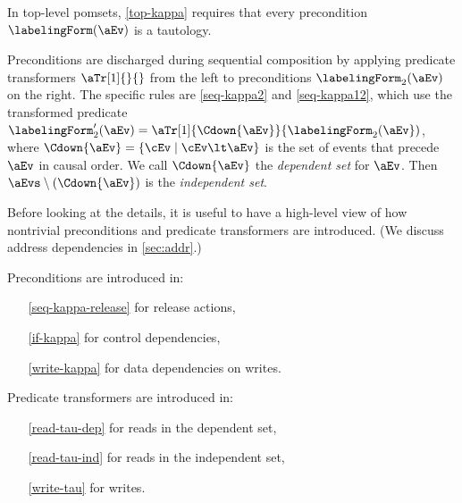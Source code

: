 In top-level pomsets, \ref{top-kappa} requires that every precondition
$\labelingForm(\aEv)$ is a tautology.

Preconditions are discharged during sequential composition by applying
predicate transformers $\aTr[1]{}{}$ from the left to preconditions
$\labelingForm_2(\aEv)$ on the right.  The specific rules are
\ref{seq-kappa2} and \ref{seq-kappa12}, which use the transformed predicate
$\labelingForm'_2(\aEv)=\aTr[1]{\Cdown{\aEv}}{\labelingForm_2(\aEv})$, where
$\Cdown{\aEv}=\{ \cEv \mid \cEv \lt \aEv \}$ is the set of events that
precede $\aEv$ in causal order.  We call $\Cdown{\aEv}$ the \emph{dependent
  set} for $\aEv$.  Then $\aEvs\setminus(\Cdown{\aEv})$ is the
\emph{independent set}. %



Before looking at the details, it is useful to have a high-level view of how
nontrivial preconditions and predicate transformers are introduced.  (We
discuss address dependencies in \textsection\ref{sec:addr}.)
\begin{multicols}{2}
  Preconditions are introduced in: 
  \begin{itemize}
  \item[\eqref{seq-kappa-release}] for release actions,
  \item[\eqref{if-kappa}] for control dependencies, 
  \item[\eqref{write-kappa}] for data dependencies on writes.
  \end{itemize}

  Predicate transformers are introduced in:
  \begin{itemize}
  \item[\eqref{read-tau-dep}] for reads in the dependent set,
  \item[\eqref{read-tau-ind}] for reads in the independent set,
  \item[\eqref{write-tau}] for writes.
  \end{itemize}
\end{multicols}


